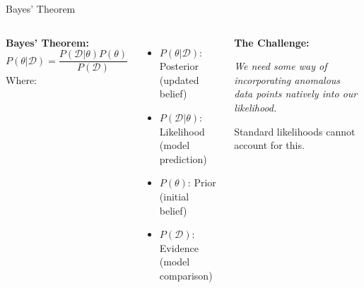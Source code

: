 \documentclass[aspectratio=169]{beamer}
\begin{document}
\begin{frame}{Bayes' Theorem}
  \begin{columns}
    \textbf{Bayes' Theorem:}
    \begin{equation}
        P(\theta | \mathcal{D}) = \frac{P(\mathcal{D} | \theta) P(\theta)}{P(\mathcal{D})}
    \end{equation}
    Where:
    \begin{itemize}
        \item $P(\theta | \mathcal{D})$: Posterior (updated belief)
        \item $P(\mathcal{D} | \theta)$: Likelihood (model prediction)
        \item $P(\theta)$: Prior (initial belief)
        \item $P(\mathcal{D})$: Evidence (model comparison)
    \end{itemize}
    
    \begin{center}
    \textbf{The Challenge:}
    \vspace{0.5cm}
    
    \textit{We need some way of incorporating anomalous data points natively into our likelihood.}
    \vspace{0.5cm}
    
    Standard likelihoods cannot account for this.
    \end{center}
  \end{columns}
\end{frame}
\end{document}
